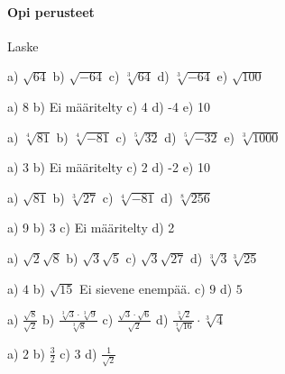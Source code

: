 \begin{tehtavasivu}

\paragraph*{Opi perusteet}

Laske
\begin{tehtava}
a) $\sqrt{64}$ \quad b) $\sqrt{-64}$ \quad c) $\sqrt[3]{64}$ \quad d) $\sqrt[3]{-64}$ \quad  e) $\sqrt{100}$

\begin{vastaus}
a) 8 b) Ei määritelty c) 4 d) -4  e) 10
\end{vastaus}
\end{tehtava}

\begin{tehtava}
a) $\sqrt[4]{81}$ \quad b) $\sqrt[4]{-81}$ \quad c) $\sqrt[5]{32}$ \quad d) $\sqrt[5]{-32}$  e) $\sqrt[3]{1000}$

\begin{vastaus}
a) 3 b) Ei määritelty c) 2 d) -2  e) 10
\end{vastaus}
\end{tehtava}

\begin{tehtava}
a) $\sqrt{81}$ \quad b) $\sqrt[3]{27}$ \quad c) $\sqrt[4]{-81}$ \quad d) $\sqrt[8]{256}$ 

\begin{vastaus}
a) 9 b) 3 c) Ei määritelty d) 2
\end{vastaus}
\end{tehtava}

\begin{tehtava} 
a) $\sqrt{2}\sqrt{8}$  \quad b)  $\sqrt{3}\sqrt{5}$ \quad c)  $\sqrt{3}\sqrt{27}$ \quad  d) $\sqrt[3]{3}\sqrt[3]{25} $
\begin{vastaus}
a) $4$ \quad b) $\sqrt{15}$  \quad Ei sievene enempää.  \quad c) $9$ \quad d) $5$
\end{vastaus}
\end{tehtava}


\begin{tehtava} 
a) $ \frac{\sqrt{8}}{\sqrt{2}}$  \quad b)   $ \frac{\sqrt[3]{3} \cdot \sqrt[3]{9}}{\sqrt[3]{8}}$   \quad c)  $ \frac{\sqrt{3} \cdot \sqrt{6}}{\sqrt{2}}$ \quad d) $ \frac {\sqrt[3]{2}}{\sqrt[3]{16}} \cdot \sqrt[3]{4}$ 
\begin{vastaus}
a) $2$ \quad b) $\frac{3}{2}$  \quad c) $3$ \quad d) $\frac{1}{\sqrt{2}}$
\end{vastaus}
\end{tehtava}



\end{tehtavasivu}
